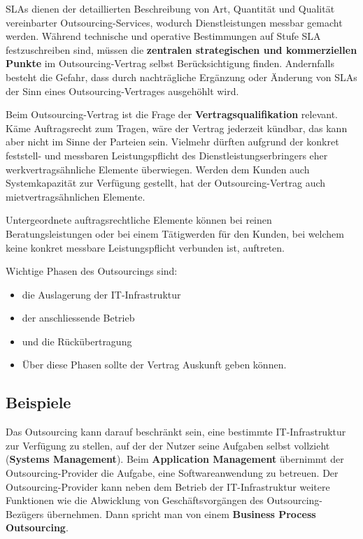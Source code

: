 SLAs dienen der detaillierten Beschreibung von Art, Quantität und Qualität vereinbarter Outsourcing-Services, wodurch Dienstleistungen messbar gemacht werden. Während technische und operative Bestimmungen auf Stufe SLA festzuschreiben sind, müssen die \textbf{zentralen strategischen und kommerziellen Punkte} im Outsourcing-Vertrag selbst Berücksichtigung finden. Andernfalls besteht die Gefahr, dass durch nachträgliche Ergänzung oder Änderung von SLAs der Sinn eines Outsourcing-Vertrages ausgehöhlt wird.
\vspace{3mm}

Beim Outsourcing-Vertrag ist die Frage der \textbf{Vertragsqualifikation} relevant. Käme Auftragsrecht zum Tragen, wäre der Vertrag jederzeit kündbar, das kann aber nicht im Sinne der Parteien sein.
Vielmehr dürften aufgrund der konkret feststell- und messbaren Leistungspflicht des Dienstleistungserbringers eher werkvertragsähnliche Elemente überwiegen. Werden dem Kunden auch Systemkapazität zur Verfügung gestellt, hat der Outsourcing-Vertrag auch mietvertragsähnlichen Elemente.

Untergeordnete auftragsrechtliche Elemente können bei reinen Beratungsleistungen oder bei einem Tätigwerden für den Kunden, bei welchem keine konkret messbare Leistungspflicht verbunden ist, auftreten. 

Wichtige Phasen des Outsourcings sind:
\begin{itemize}
  \item die Auslagerung der IT-Infrastruktur
  \item der anschliessende Betrieb
  \item und die Rückübertragung
  \item Über diese Phasen sollte der Vertrag Auskunft geben können.
\end{itemize}

\vspace{3mm}

\subsection{Beispiele}

Das Outsourcing kann darauf beschränkt sein, eine bestimmte IT-Infrastruktur zur Verfügung zu stellen, auf der der Nutzer seine Aufgaben selbst vollzieht (\textbf{Systems Management}).
Beim \textbf{Application Management} übernimmt der Outsourcing-Provider die Aufgabe, eine Softwareanwendung zu betreuen.
Der Outsourcing-Provider kann neben dem Betrieb der IT-Infrastruktur weitere Funktionen wie die Abwicklung von Geschäftsvorgängen des Outsourcing-Bezügers übernehmen. Dann spricht man von einem \textbf{Business Process Outsourcing}.

